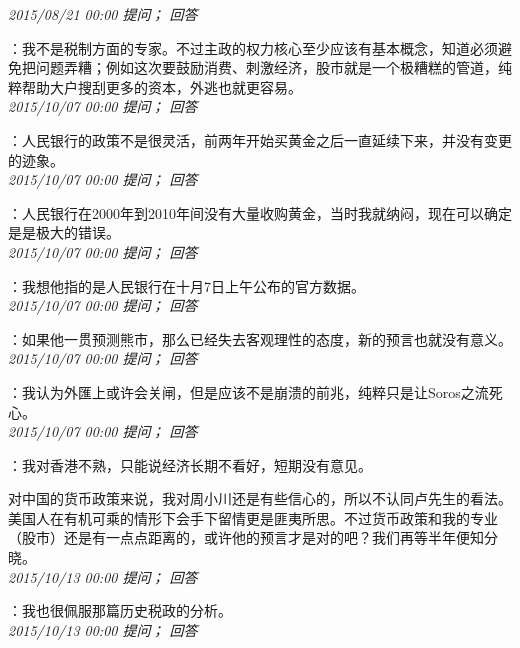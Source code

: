 \documentclass[twocolumn]{ctexart}
\begin{document}
\textit{\hfill\noindent\small 2015/08/21 00:00 提问； 回答}

：我不是税制方面的专家。不过主政的权力核心至少应该有基本概念，知道必须避免把问题弄糟；例如这次要鼓励消费、刺激经济，股市就是一个极糟糕的管道，纯粹帮助大户搜刮更多的资本，外逃也就更容易。\\

\textit{\hfill\noindent\small 2015/10/07 00:00 提问； 回答}

：人民银行的政策不是很灵活，前两年开始买黄金之后一直延续下来，并没有变更的迹象。\\

\textit{\hfill\noindent\small 2015/10/07 00:00 提问； 回答}

：人民银行在2000年到2010年间没有大量收购黄金，当时我就纳闷，现在可以确定是是极大的错误。\\

\textit{\hfill\noindent\small 2015/10/07 00:00 提问； 回答}

：我想他指的是人民银行在十月7日上午公布的官方数据。\\

\textit{\hfill\noindent\small 2015/10/07 00:00 提问； 回答}

：如果他一贯预测熊市，那么已经失去客观理性的态度，新的预言也就没有意义。\\

\textit{\hfill\noindent\small 2015/10/07 00:00 提问； 回答}

：我认为外匯上或许会关闸，但是应该不是崩溃的前兆，纯粹只是让Soros之流死心。\\

\textit{\hfill\noindent\small 2015/10/07 00:00 提问； 回答}

：我对香港不熟，只能说经济长期不看好，短期没有意见。

对中国的货币政策来说，我对周小川还是有些信心的，所以不认同卢先生的看法。美国人在有机可乘的情形下会手下留情更是匪夷所思。不过货币政策和我的专业（股市）还是有一点点距离的，或许他的预言才是对的吧？我们再等半年便知分晓。\\

\textit{\hfill\noindent\small 2015/10/13 00:00 提问； 回答}

：我也很佩服那篇历史税政的分析。\\

\textit{\hfill\noindent\small 2015/10/13 00:00 提问； 回答}
\end{document}
